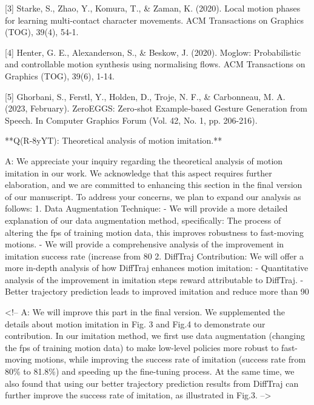 [3] Starke, S., Zhao, Y., Komura, T., & Zaman, K. (2020). Local motion phases for learning multi-contact character movements. ACM Transactions on Graphics (TOG), 39(4), 54-1.

[4] Henter, G. E., Alexanderson, S., & Beskow, J. (2020). Moglow: Probabilistic and controllable motion synthesis using normalising flows. ACM Transactions on Graphics (TOG), 39(6), 1-14.

[5] Ghorbani, S., Ferstl, Y., Holden, D., Troje, N. F., & Carbonneau, M. A. (2023, February). ZeroEGGS: Zero‐shot Example‐based Gesture Generation from Speech. In Computer Graphics Forum (Vol. 42, No. 1, pp. 206-216).






**Q(R-8yYT): Theoretical analysis of motion imitation.**

A: We appreciate your inquiry regarding the theoretical analysis of motion imitation in our work. We acknowledge that this aspect requires further elaboration, and we are committed to enhancing this section in the final version of our manuscript. To address your concerns, we plan to expand our analysis as follows:
1. Data Augmentation Technique:
- We will provide a more detailed explanation of our data augmentation method, specifically: The process of altering the fps of training motion data, this improves robustness to fast-moving motions. 
- We will provide a comprehensive analysis of the improvement in imitation success rate (increase from 80%
2. DiffTraj Contribution:
We will offer a more in-depth analysis of how DiffTraj enhances motion imitation:
- Quantitative analysis of the improvement in imitation steps reward attributable to DiffTraj. 
- Better trajectory prediction leads to improved imitation and reduce more than 90%

<!-- A: We will improve this part in the final version. We supplemented the details about motion imitation in Fig. 3 and Fig.4 to demonstrate our contribution. In our imitation method, we first use data augmentation (changing the fps of training motion data) to make low-level policies more robust to fast-moving motions, while improving the success rate of imitation (success rate from 80\% to 81.8\%) and speeding up the fine-tuning process. At the same time, we also found that using our better trajectory prediction results from DiffTraj can further improve the success rate of imitation, as illustrated in Fig.3.  -->
